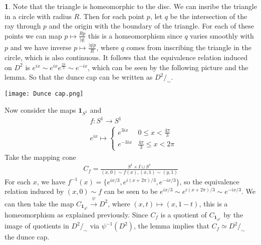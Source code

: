 \documentclass[10.5pt]{article}
\theoremstyle{definition}
\newtheorem{pb}{}
\newcommand{\set}[1]{\{#1\}}
\newcommand{\abs}[1]{\lvert#1\rvert}
\newcommand{\ism}{\simeq}
\begin{document}
    \begin{pb}
        Note that the triangle is homeomorphic to the disc. We can insribe the triangle in a circle with radius \(R\). Then for each point \(p\), let \(q\) be the intersection
        of the ray through \(p \) and the origin with the boundary of the triangle. For each of these points we can map \(p \mapsto \frac{Rp }{\abs{q }}\) this is a homeomorphism
        since \(q\) varies smoothly with \(p\) and we have inverse \(p \mapsto \frac{\abs{q}p}{R}\), where \(q\) comes from inscribing the triangle in the circle, which is also continuous.
        It follows that the equivalence relation induced on \(D^2\) is \(e^{ix} \sim e^{ix}e^{\frac{2\pi}{3}} \sim e^{-ix}\), which can be seen by the following picture and the lemma. So that
        the dunce cap can be written as \(D^2/_\sim\).
        \begin{center}
            \texttt{[image: Dunce cap.png]}
        \end{center}

        Now consider the maps \(\mathbf{1}_{S^1}\) and
        \begin{align*}
            &f:S^1 \to S^1 \\
            &e^{ix} \mapsto \begin{cases}
                e^{3ix} & 0 \leq x < \frac{4\pi}{3} \\
                e^{-3ix} & \frac{4\pi}{3} \leq x < 2\pi
            \end{cases}
        \end{align*}
        Take the mapping cone 
        \begin{align*}
            C_f = \frac{S^1 \times I \sqcup S^1}{(x,0) \sim f(x), (x,1) \sim (y,1)}
        \end{align*}
        For each \(x\), we have \(f^{-1}(x) = \set{e^{ix/3},e^{i(x + 2\pi)/3},e^{-ix/3}}\), so the equivalence relation induced by \((x,0) \sim f\) can be seen to be 
        \(e^{ix/3}\sim e^{i(x + 2\pi)/3}\sim e^{-ix/3}\). 
        We can then take the map \(C_{\mathbf{1}_{S^1}} \overset{\psi}{\to} D^2\), where \((x,t) \mapsto (x,1-t)\), this is a homeomorphism as explained previously. 
        Since \(C_f\) is a quotient of \(C_{\mathbf{1}_{S^1}}\) by the image of quotients in \(D^2/_\sim\) via \(\psi^{-1}(D^2)\), the lemma implies that \(C_f \ism D^2/_\sim\) the dunce cap.


\end{pb}
\end{document}
